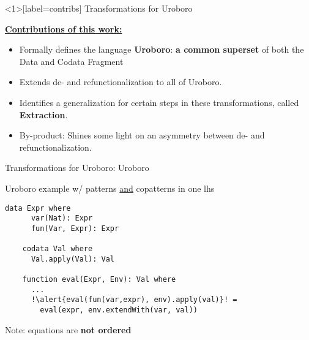 \documentclass[xcolor=svgnames]{beamer}
\begin{document}

\begin{frame}<1>[label=contribs]
  {Transformations for Uroboro}

  \underline{\textbf{Contributions of this work:}}

  \begin{itemize}
  \item \alert<2>{Formally defines the language \textbf{Uroboro}: \textbf{a common superset} of both the Data and Codata Fragment}

  \item \alert<3>{Extends de- and refunctionalization to all of Uroboro.}

  \item \alert<4>{Identifies a generalization for certain steps in these transformations, called \textbf{Extraction}.}

  \item \alert<5>{By-product: Shines some light on an asymmetry between de- and refunctionalization.}
   \end{itemize}
\end{frame}


\begin{frame}[fragile]
  {Transformations for Uroboro: Uroboro}

  \begin{block}{Uroboro example w/ patterns \underline{and} copatterns in one lhs}
    \begin{lstlisting}[escapechar=!]
    data Expr where
      var(Nat): Expr
      fun(Var, Expr): Expr

    codata Val where
      Val.apply(Val): Val

    function eval(Expr, Env): Val where
      ...
      !\alert{eval(fun(var,expr), env).apply(val)}! = 
        eval(expr, env.extendWith(var, val))
    \end{lstlisting}
  \end{block}

  Note: equations are \textbf{not ordered}
\end{frame}
\end{document}
